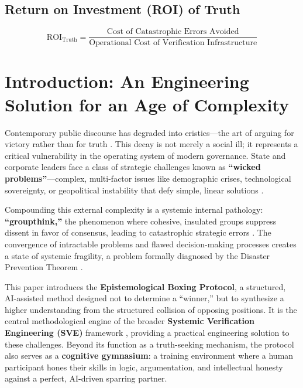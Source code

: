 \documentclass[11pt,a4paper]{article}
\begin{document}
\subsection*{Return on Investment (ROI) of Truth}
\begin{equation}
\text{ROI}_{\text{Truth}} = \frac{\text{Cost of Catastrophic Errors Avoided}}{\text{Operational Cost of Verification Infrastructure}}
\label{eq:roi}
\end{equation}

\vspace{0.5cm}
\clearpage
\setcounter{page}{1}


\section{Introduction: An Engineering Solution for an Age of Complexity}

Contemporary public discourse has degraded into eristics---the art of arguing for victory rather than for truth \citep{Mercier2011}. This decay is not merely a social ill; it represents a critical vulnerability in the operating system of modern governance. State and corporate leaders face a class of strategic challenges known as \textbf{``wicked problems''}---complex, multi-factor issues like demographic crises, technological sovereignty, or geopolitical instability that defy simple, linear solutions \citep{Rittel1973}.

Compounding this external complexity is a systemic internal pathology: \textbf{``groupthink,''} the phenomenon where cohesive, insulated groups suppress dissent in favor of consensus, leading to catastrophic strategic errors \citep{Janis1982}. The convergence of intractable problems and flawed decision-making processes creates a state of systemic fragility, a problem formally diagnosed by the Disaster Prevention Theorem \citep{Kovnatsky2025SVE1}.

This paper introduces the \textbf{Epistemological Boxing Protocol}, a structured, AI-assisted method designed not to determine a ``winner,'' but to synthesize a higher understanding from the structured collision of opposing positions. It is the central methodological engine of the broader \textbf{Systemic Verification Engineering (SVE)} framework \citep{Kovnatsky2025SVE2}, providing a practical engineering solution to these challenges. Beyond its function as a truth-seeking mechanism, the protocol also serves as a \textbf{cognitive gymnasium}: a training environment where a human participant hones their skills in logic, argumentation, and intellectual honesty against a perfect, AI-driven sparring partner.
\end{document}
